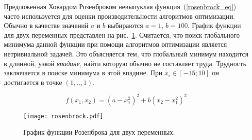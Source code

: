 Предложенная Ховардом Розенброком невыпуклая функция~(\ref{rosenbrock_eq}) часто используется для оценки производительности алгоритмов оптимизации. Обычно в качестве значений $a$ и $b$ выбираются $a = 1$, $b = 100$. График функции для двух переменных представлен на рис.~\ref{rosenbrock_plot}. Считается, что поиск глобального минимума данной функции при помощи алгоритмов оптимизации является нетривиальной задачей. Это объясняется тем, что глобальный минимум находится в длинной, узкой \textit{впадине}, найти которую обычно не составляет труда. Трудность заключается в поиске минимума в этой впадине. При $x_i \in [-15; 10]$ он достигается в точке $(1,..,1)$.

\begin{equation}
\label{rosenbrock_eq}
f(x_1, x_2) = (a - x_1^2)^2 + b(x_2 - x_1^2)^2
\end{equation}


\begin{figure}
    \centering
    \texttt{[image: rosenbrock.pdf]}
    \caption{График функции Розенброка для двух переменных.}
    \label{rosenbrock_plot}
\end{figure}

